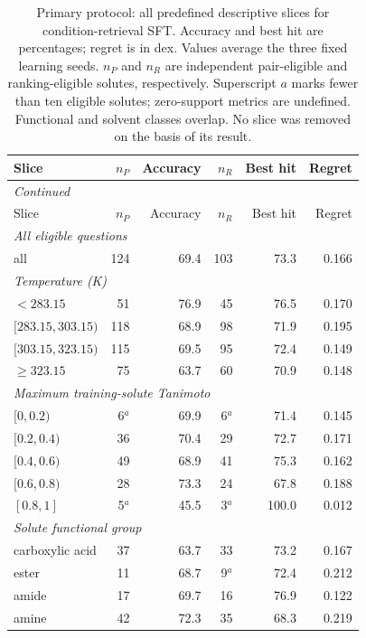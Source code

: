 \begingroup\footnotesize
\setlength{\tabcolsep}{3pt}
\begin{longtable}{lrrrrr}
\caption{Primary protocol: all predefined descriptive slices for condition-retrieval SFT. Accuracy and best hit are percentages; regret is in dex. Values average the three fixed learning seeds. $n_P$ and $n_R$ are independent pair-eligible and ranking-eligible solutes, respectively. Superscript $a$ marks fewer than ten eligible solutes; zero-support metrics are undefined. Functional and solvent classes overlap. No slice was removed on the basis of its result.}\label{tab:si-slices-primary}\\
\toprule
Slice & $n_P$ & Accuracy & $n_R$ & Best hit & Regret \\
\midrule
\endfirsthead
\multicolumn{6}{l}{\textit{Continued}} \\
\toprule
Slice & $n_P$ & Accuracy & $n_R$ & Best hit & Regret \\
\midrule
\endhead
\multicolumn{6}{l}{\textit{All eligible questions}} \\
all & 124 & 69.4 & 103 & 73.3 & 0.166 \\
\multicolumn{6}{l}{\textit{Temperature (K)}} \\
$<283.15$ & 51 & 76.9 & 45 & 76.5 & 0.170 \\
$[283.15,303.15)$ & 118 & 68.9 & 98 & 71.9 & 0.195 \\
$[303.15,323.15)$ & 115 & 69.5 & 95 & 72.4 & 0.149 \\
$\geq 323.15$ & 75 & 63.7 & 60 & 70.9 & 0.148 \\
\multicolumn{6}{l}{\textit{Maximum training-solute Tanimoto}} \\
$[0,0.2)$ & 6$^{a}$ & 69.9 & 6$^{a}$ & 71.4 & 0.145 \\
$[0.2,0.4)$ & 36 & 70.4 & 29 & 72.7 & 0.171 \\
$[0.4,0.6)$ & 49 & 68.9 & 41 & 75.3 & 0.162 \\
$[0.6,0.8)$ & 28 & 73.3 & 24 & 67.8 & 0.188 \\
$[0.8,1]$ & 5$^{a}$ & 45.5 & 3$^{a}$ & 100.0 & 0.012 \\
\multicolumn{6}{l}{\textit{Solute functional group}} \\
carboxylic acid & 37 & 63.7 & 33 & 73.2 & 0.167 \\
ester & 11 & 68.7 & 9$^{a}$ & 72.4 & 0.212 \\
amide & 17 & 69.7 & 16 & 76.9 & 0.122 \\
amine & 42 & 72.3 & 35 & 68.3 & 0.219 \\

\end{longtable}
